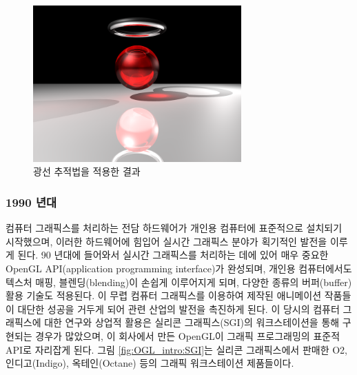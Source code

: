 \begin{figure}[h!]
  \centering
    \includegraphics[width=8cm]{OGL_intro/raytracing.png}
    \caption{광선 추적법을 적용한 결과}
    \label{fig:OGL_intro:raytracing}
\end{figure}

\subsubsection{1990 년대}

컴퓨터 그래픽스를 처리하는 전담 하드웨어가 개인용 컴퓨터에 표준적으로 설치되기 시작했으며, 이러한 하드웨어에 힘입어 실시간 그래픽스 분야가 획기적인 발전을 이루게 된다. 90 년대에 들어와서 실시간 그래픽스를 처리하는 데에 있어 매우 중요한 OpenGL API(application programming interface)가 완성되며, 개인용 컴퓨터에서도 텍스처 매핑, 블렌딩(blending)이 손쉽게 이루어지게 되며, 다양한 종류의 버퍼(buffer) 활용 기술도 적용된다.
이 무렵 컴퓨터 그래픽스를 이용하여 제작된 애니메이션 작품들이 대단한 성공을 거두게 되어 관련 산업의 발전을 촉진하게 된다. 
이 당시의 컴퓨터 그래픽스에 대한 연구와 상업적 활용은 실리콘 그래픽스(SGI)의 워크스테이션을 통해 구현되는 경우가 많았으며, 이 회사에서 만든 OpenGL이 그래픽 프로그래밍의 표준적 API로 자리잡게 된다. 그림 \ref{fig:OGL_intro:SGI}는 실리콘 그래픽스에서 판매한 O2, 인디고(Indigo), 옥테인(Octane) 등의 그래픽 워크스테이션 제품들이다.


